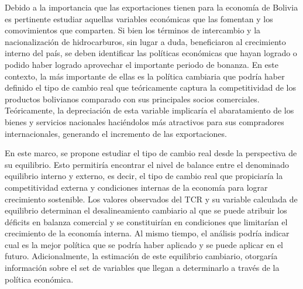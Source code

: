 \documentclass[12pt,letterpaper]{article}
\begin{document}
Debido a la importancia que las exportaciones tienen para la economía de Bolivia es pertinente estudiar aquellas variables económicas que las fomentan y los comovimientos que comparten. Si bien los términos de intercambio y la nacionalización de hidrocarburos, sin lugar a duda, beneficiaron al crecimiento interno del país, se deben identificar las políticas económicas que hayan logrado o podido haber logrado aprovechar el importante periodo de bonanza. En este contexto, la más importante de ellas es la política cambiaria que podría haber definido el tipo de cambio real que teóricamente captura la competitividad de los productos bolivianos comparado con sus principales socios comerciales. Teóricamente, la depreciación de esta variable implicaría el abaratamiento de los bienes y servicios nacionales haciéndolos más atractivos para sus compradores internacionales, generando el incremento de las exportaciones.

En este marco, se propone estudiar el tipo de cambio real desde la perspectiva de su equilibrio. Esto permitiría encontrar el nivel de balance entre el denominado equilibrio interno y externo, es decir, el tipo de cambio real que propiciaría la competitividad externa y condiciones internas de la economía para lograr crecimiento sostenible. Los valores observados del TCR y su variable calculada de equilibrio determinan el desalineamiento cambiario al que se puede atribuir los déficits en balanza comercial y se constituirían en condiciones que limitarían el crecimiento de la economía interna. Al mismo tiempo, el análisis podría indicar cual es la mejor política que se podría haber aplicado y se puede aplicar en el futuro. Adicionalmente, la estimación de este equilibrio cambiario, otorgaría información sobre el set de variables que llegan a determinarlo a través de la política económica.
\end{document}

